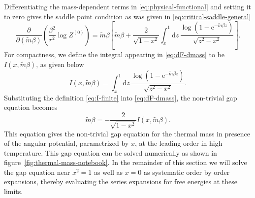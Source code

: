 \documentclass[a4paper,11pt]{article}
\newcommand{\figref}[1]{figure~\ref{#1}}
\newcommand{\e}{\mathrm e}
\newcommand{\dd}{\mathrm d}
\begin{document}
Differentiating the mass-dependent terms in \eqref{eq:physical-functional} and setting it to zero gives the saddle point condition as was given in \eqref{eq:critical-saddle-general}
\begin{equation}
 \frac{\partial}{\partial(\tilde m\beta)}\left(\frac{\beta^2}{r^2}\log Z^{(0)}\right)
 =\tilde m\beta\left[
 \tilde m\beta+\frac{2}{\sqrt{1-x^2}}
 \int_x^1\dd z\,
 \frac{\log(1-\e^{-\tilde m\beta z})}{\sqrt{z^2-x^2}}
 \right].
 \label{eq:dF-dmass}
\end{equation}
For compactness, we define the integral appearing  in \eqref{eq:dF-dmass} to be $I(x,\tilde m \beta )$, as given below
\begin{equation}
 I(x,\tilde m\beta)=\int_x^1\dd z\,
 \frac{\log(1-\e^{-\tilde m\beta z})}{\sqrt{z^2-x^2}}.
 \label{eq:I-finite}
\end{equation}
Substituting the definition \eqref{eq:I-finite} into \eqref{eq:dF-dmass}, the non-trivial 
gap equation becomes
\begin{equation}
 \tilde m\beta=-\frac{2}{\sqrt{1-x^2}}I(x,\tilde m\beta).
 \label{eq:gap-I}
\end{equation}
This equation gives the non-trivial gap equation for the thermal mass in presence of the angular potential, parametrized by $x$, at the leading order in high temperature. This gap equation can be solved numerically as shown in  \figref{fig:thermal-mass-notebook}. In the remainder of this section we will solve the gap equation near $x^2=1$ as well as $x=0$ as systematic order by order expansions, thereby evaluating the series expansions for free energies at these limits.
\end{document}

